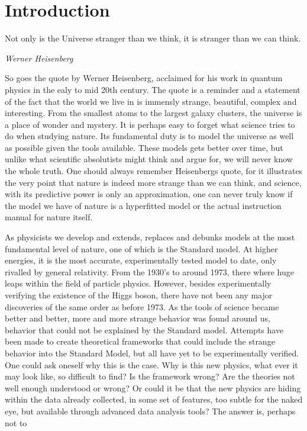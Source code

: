 \chapter*{Introduction}

\epigraph{Not only is the Universe stranger than we think, it is stranger than we can think.}{\textit{Werner Heisenberg}}
So goes the quote by Werner Heisenberg, acclaimed for his work in quantum physics in the ealy to mid 
20th century. The quote is a reminder and a statement of the fact that the world we live in is immensly 
strange, beautiful, complex and interesting. From the smallest atoms to the largest galaxy clusters, 
the universe is a place of wonder and mystery. It is perhaps easy to forget what science tries to do
when studying nature. Its fundamental duty is to model the universe as well as possible given the tools 
available. These models gets better over time, but unlike what scientific absolutists might think and 
argue for, we will never know the whole truth. One should always remember Heisenbergs quote, for it
illustrates the very point that nature is indeed more strange than we can think, and science, with its 
predictive power is only an approximation, one can never truly know if the model we have of nature is 
a hyperfitted model or the actual instruction manual for nature itself. \par As physicists we develop 
and extends, replaces and debunks models at the most fundamental level of nature, one of which is
the Standard model. At higher energies, it is the most accurate, experimentally tested model to date,
only rivalled by general relativity. From the 1930's to around 1973, there where huge leaps within the field
of particle physics. However, besides experimentally verifying the existence of the Higgs boson,
there have not been any major discoveries of the same order as before 1973. As the tools of science became 
better and better, more and more strange behavior was found around us, behavior that could not be explained by the 
Standard model. Attempts have been made to create theoretical frameworks that could include the strange behavior 
into the Standard Model, but all have yet to be experimentally verified. One could ask oneself why 
this is the case. Why is this new physics, what ever it may look like, so difficult to find? 
Is the framework wrong? Are the theories not well enough understood or wrong? Or could it be that
the new physics are hiding within the data already collected, in some set of features, too subtle for
the naked eye, but available through advanced data analysis tools? The answer is, perhaps not to 
